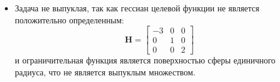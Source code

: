 \documentclass{article}
\begin{document}
\begin{enumerate}
\begin{itemize}
			      Решение этой системы уравнений:
			      \begin{equation*}
				      \begin{aligned}
					       & x_1     \approx &   & 0.36017, \\
					       & x_2     \approx & - & 0.81732, \\
					       & x_3     \approx & - & 0.44974, \\
					       & \lambda \approx & - & 0.22351
				      \end{aligned}
			      \end{equation*}

		      \item[(b)]
			      Задача не выпуклая, так как гессиан целевой функции
			      не является положительно определенным:
			      \[
				      \mathbf{H} = \begin{bmatrix}
					      -3 & 0 & 0 \\
					      0  & 1 & 0 \\
					      0  & 0 & 2
				      \end{bmatrix}
			      \]
			      и ограничительная функция является
			      поверхностью сферы единичного радиуса,
			      что не является выпуклым множеством.


\end{itemize}
\end{enumerate}
\end{document}
